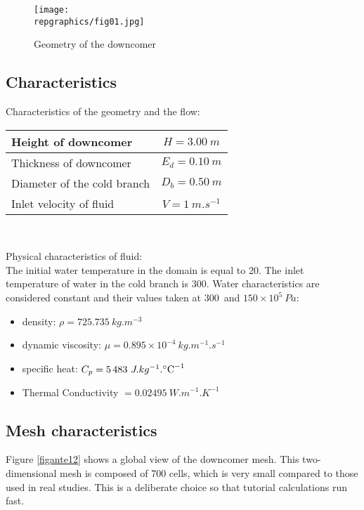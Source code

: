 \begin{figure}[h!]
\begin{center}
\texttt{[image: \\repgraphics/fig01.jpg]}
\caption{Geometry of the downcomer}
\label{figante11}
\end{center}
\end{figure}

        \subsection{Characteristics}

Characteristics of the geometry and the flow:
\begin{center}
\begin{tabular}{|l|c|}
\hline
Height of downcomer & $H = 3.00\ m$ \\
\hline
Thickness of downcomer & $E_{d} = 0.10\ m$ \\
\hline
Diameter of the cold branch & $D_{b} = 0.50\ m$ \\
\hline
Inlet velocity of fluid & $V = 1\ m.s^{-1}$ \\
\hline
\end{tabular}\\
\end{center}

Physical characteristics of fluid:\\
The initial water temperature in the domain is equal to 20\degresC.
The inlet temperature of water in the cold branch is 300\degresC.
Water characteristics are considered constant and their values taken at
300\degresC\ and $150\times 10^{5}\ Pa$:
\begin{itemize}
        \item density: $\rho = 725.735\ kg.m^{-3}$
        \item dynamic viscosity: $\mu = 0.895\times10^{-4}\ kg.m^{-1}.s^{-1}$
        \item specific heat: $C_{p} = 5\,483\ J.kg^{-1}.\mbox{\degresC}^{-1}$
        \item Thermal Conductivity $ = 0.02495\ W.m^{-1}.K^{-1}$
\end{itemize}


        \subsection{Mesh characteristics}

Figure \ref{figante12} shows a global view of the downcomer mesh. This
two-dimensional mesh is composed
of 700 cells, which is very small compared to those used in real
studies. This is
a deliberate choice so that tutorial calculations run fast.

